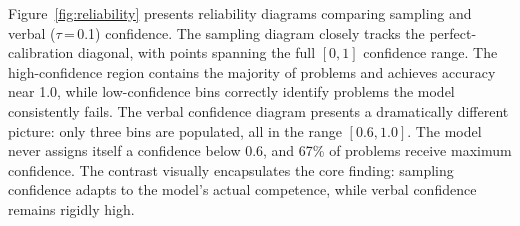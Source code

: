 \documentclass{article}
\begin{document}
Figure~\ref{fig:reliability} presents reliability diagrams comparing sampling and verbal ($\tau$\,=\,0.1) confidence. The sampling diagram closely tracks the perfect-calibration diagonal, with points spanning the full $[0,1]$ confidence range. The high-confidence region contains the majority of problems and achieves accuracy near 1.0, while low-confidence bins correctly identify problems the model consistently fails. The verbal confidence diagram presents a dramatically different picture: only three bins are populated, all in the range $[0.6, 1.0]$. The model never assigns itself a confidence below 0.6, and 67\% of problems receive maximum confidence. The contrast visually encapsulates the core finding: sampling confidence adapts to the model's actual competence, while verbal confidence remains rigidly high.

\begin{figure}[t]
\centering
{}
\end{figure}
\end{document}
